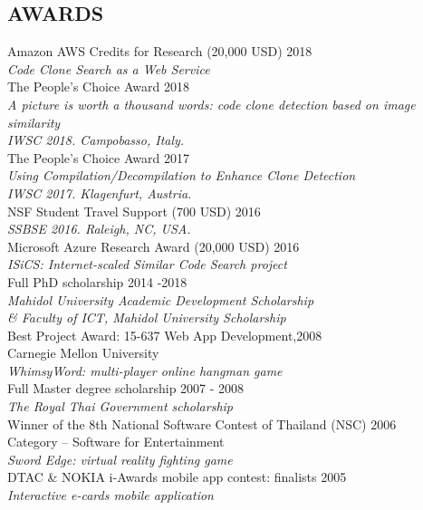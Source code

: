 \documentclass[margin, 10pt]{res} %
\begin{document}
\begin{resume}
\section{AWARDS}
Amazon AWS Credits for Research (20,000 USD) \hfill 2018 \\ 
\textit{Code Clone Search as a Web Service} \vspace{2mm} \\
The People's Choice Award \hfill 2018 \\ 
\textit{A picture is worth a thousand words: code clone detection based on image similarity} \\
\textit{IWSC 2018. Campobasso, Italy.} \vspace{2mm} \\
The People's Choice Award \hfill 2017 \\ 
\textit{Using Compilation/Decompilation to Enhance Clone Detection} \\
\textit{IWSC 2017. Klagenfurt, Austria.} \vspace{2mm} \\
NSF Student Travel Support (700 USD) \hfill 2016 \\ 
\textit{SSBSE 2016. Raleigh, NC, USA.} \vspace{2mm} \\
Microsoft Azure Research Award (20,000 USD) \hfill 2016 \\ 
\textit{ISiCS: Internet-scaled Similar Code Search project} \vspace{2mm} \\
Full PhD scholarship \hfill 2014 -2018 \\
\textit{Mahidol University Academic Development Scholarship \\ 
\& Faculty of ICT, Mahidol University Scholarship} \vspace{2mm} \\
Best Project Award: 15-637 Web App Development,\hfill 2008 \\Carnegie Mellon University \\ 
\textit{WhimsyWord: multi-player online hangman game} \vspace{2mm} \\
Full Master degree scholarship \hfill 2007 - 2008 \\
\textit{The Royal Thai Government scholarship} \vspace{2mm} \\
Winner of the 8th National Software Contest of Thailand (NSC) \hfill 2006 \\ 
Category -- Software for Entertainment \\
\textit{Sword Edge: virtual reality fighting game} \vspace{2mm} \\
DTAC \& NOKIA i-Awards mobile app contest: finalists \hfill 2005  \\
\textit{Interactive e-cards mobile application}
 

\end{resume}
\end{document}
